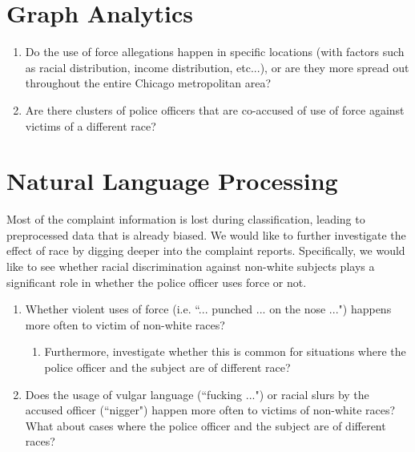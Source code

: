 \documentclass[10pt]{article}
\begin{document}
\section{Graph Analytics}

\begin{enumerate}

\item Do the use of force allegations happen in specific locations (with factors such as racial distribution, income distribution, etc...), or are they more spread out throughout the entire Chicago metropolitan area?

\item Are there clusters of police officers that are co-accused of use of force against victims of a different race?

\end{enumerate}



\section{Natural Language Processing}

Most of the complaint information is lost during classification, leading to preprocessed data that is already biased. We would like to further investigate the effect of race by digging deeper into the complaint reports. Specifically, we would like to see whether racial discrimination against non-white subjects plays a significant role in whether the police officer uses force or not.

\begin{enumerate}

\item Whether violent uses of force (i.e. ``... punched ... on the nose ...") happens more often to victim of non-white races?

    \begin{enumerate}

    \item Furthermore, investigate whether this is common for situations where the police officer and the subject are of different race?

    \end{enumerate}

\item Does the usage of vulgar language (``fucking ...") or racial slurs by the accused officer (``nigger") happen more often to victims of non-white races? What about cases where the police officer and the subject are of different races?

\end{enumerate}
\end{document}
